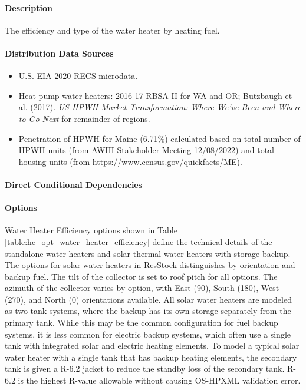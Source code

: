 \paragraph{Description}
% 
The efficiency and type of the water heater by heating fuel.

\paragraph{Distribution Data Sources}
% 
\begin{itemize}
\item
  U.S. EIA 2020 RECS microdata.
\item
  Heat pump water heaters: 2016-17 RBSA II for WA and OR; Butzbaugh
  et al. (\href{https://www.osti.gov/biblio/1433775}{2017}). \textit{US HPWH Market Transformation: Where
  We've Been and Where to Go Next} for remainder of
  regions.
\item
  Penetration of HPWH for Maine (6.71\%) calculated based on total
  number of HPWH units (from AWHI Stakeholder Meeting 12/08/2022) and total
  housing units (from \url{https://www.census.gov/quickfacts/ME}).
\end{itemize}

\paragraph{Direct Conditional Dependencies}


\paragraph{Options}
Water Heater Efficiency options shown in Table \ref{table:hc_opt_water_heater_efficiency} define the technical details of the standalone water heaters and solar thermal water heaters with storage backup. The options for solar water heaters in ResStock distinguishes by orientation and backup fuel. The tilt of the collector is set to roof pitch for all options. The azimuth of the collector varies by option, with East (90\degree), South (180\degree), West (270\degree), and North (0\degree) orientations available.
All solar water heaters are modeled as two-tank systems, where the backup has its own storage separately from the primary tank. While this may be the common configuration for fuel backup systems, it is less common for electric backup systems, which often use a single tank with integrated solar and electric heating elements. To model a typical solar water heater with a single tank that has backup heating elements, the secondary tank is given a R-6.2 jacket to reduce the standby loss of the secondary tank. R-6.2 is the highest R-value allowable without causing OS-HPXML validation error.

